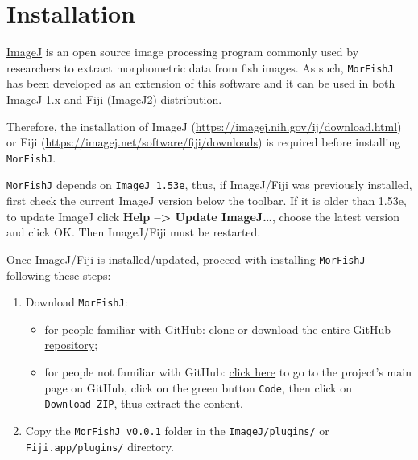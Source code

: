 \documentclass[
  letterpaper,
]{scrbook}
\providecommand{\tightlist}{%
  \setlength{\itemsep}{0pt}\setlength{\parskip}{0pt}}\usepackage{longtable,booktabs,array}
\begin{document}
\hypertarget{installation}{%
\chapter{Installation}\label{installation}}

\href{https://imagej.nih.gov/ij/}{ImageJ} is an open source image
processing program commonly used by researchers to extract morphometric
data from fish images. As such, \texttt{MorFishJ} has been developed as
an extension of this software and it can be used in both ImageJ 1.x and
Fiji (ImageJ2) distribution.

Therefore, the installation of ImageJ
(\url{https://imagej.nih.gov/ij/download.html}) or Fiji
(\url{https://imagej.net/software/fiji/downloads}) is required before
installing \texttt{MorFishJ}.

\begin{tcolorbox}[standard jigsaw,bottomtitle=1mm, toptitle=1mm, colframe=quarto-callout-warning-color-frame, colbacktitle=quarto-callout-warning-color!10!white, title=\textcolor{quarto-callout-warning-color}{\faExclamationTriangle}\hspace{0.5em}{Warning}, titlerule=0mm, opacityback=0, arc=.35mm, opacitybacktitle=0.6, rightrule=.15mm, toprule=.15mm, coltitle=black, left=2mm, colback=white, leftrule=.75mm, bottomrule=.15mm]
\texttt{MorFishJ} depends on \texttt{ImageJ\ 1.53e}, thus, if
ImageJ/Fiji was previously installed, first check the current ImageJ
version below the toolbar. If it is older than 1.53e, to update ImageJ
click \textbf{Help --\textgreater{} Update ImageJ\ldots{}}, choose the
latest version and click OK. Then ImageJ/Fiji must be restarted.
\end{tcolorbox}

Once ImageJ/Fiji is installed/updated, proceed with installing
\texttt{MorFishJ} following these steps:

\begin{enumerate}
\def\labelenumi{\arabic{enumi}.}
\tightlist
\item
  Download \texttt{MorFishJ}:

  \begin{itemize}
  \tightlist
  \item
    for people familiar with GitHub: clone or download the entire
    \href{https://github.com/mattiaghilardi/MorFishJ}{GitHub
    repository};\\
  \item
    for people not familiar with GitHub:
    \href{https://github.com/mattiaghilardi/MorFishJ}{click here} to go
    to the project's main page on GitHub, click on the green button
    \texttt{Code}, then click on \texttt{Download\ ZIP}, thus extract
    the content.\\
  \end{itemize}
\item
  Copy the \texttt{MorFishJ\ v0.0.1} folder in the
  \texttt{ImageJ/plugins/} or \texttt{Fiji.app/plugins/} directory.
\end{enumerate}
\end{document}

